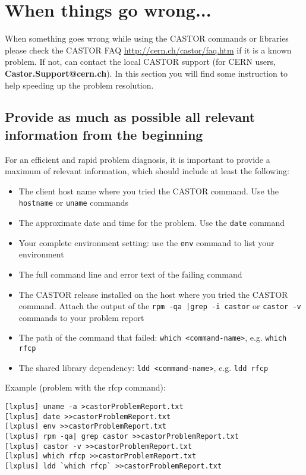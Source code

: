 \chapter{When things go wrong...}
When something goes wrong while using the CASTOR commands or libraries please check the CASTOR FAQ
\url{http://cern.ch/castor/faq.htm} if it is a known problem. If not, can contact
the local CASTOR support (for CERN users, {\bf Castor.Support@cern.ch}). In this section you
will find some instruction to help speeding up the problem resolution.

\section{Provide as much as possible all relevant information from the beginning}
For an efficient and rapid problem diagnosis, it is important to provide a maximum
of relevant information, which should include at least the following:
\begin{itemize}
   \item The client host name where you tried the CASTOR command. Use the
        {\tt hostname} or {\tt uname} commands
   \item The approximate date and time for the problem. Use the {\tt date}
        command
   \item Your complete environment setting: use the {\tt env} command to list
        your environment
   \item The full command line and error text of the failing command
   \item The CASTOR release installed on the host where you tried the CASTOR command. Attach
         the output of the {\tt rpm -qa |grep -i castor} or {\tt castor -v} commands to your
         problem report
   \item The path of the command that failed: {\tt which <command-name>},
         e.g. {\tt which rfcp}
   \item The shared library dependency: {\tt ldd <command-name>}, e.g. {\tt ldd rfcp}
\end{itemize}

Example (problem with the rfcp command):
\small
\begin{verbatim}
[lxplus] uname -a >castorProblemReport.txt
[lxplus] date >>castorProblemReport.txt
[lxplus] env >>castorProblemReport.txt
[lxplus] rpm -qa| grep castor >>castorProblemReport.txt
[lxplus] castor -v >>castorProblemReport.txt
[lxplus] which rfcp >>castorProblemReport.txt
[lxplus] ldd `which rfcp` >>castorProblemReport.txt
\end{verbatim}
\normalsize


